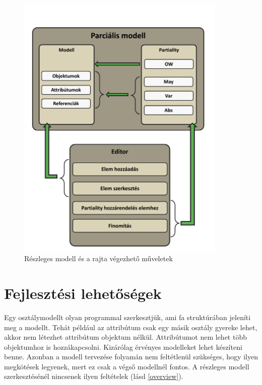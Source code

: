 \begin{figure}[!ht]
	\centering
	\includegraphics[width=100mm]{figures/overview.pdf}
	\caption{Részleges modell és a rajta végezhető műveletek} 
	\label{overview}
\end{figure}


\section{Fejlesztési lehetőségek}
Egy osztálymodellt olyan programmal szerkesztjük, ami fa struktúrában jeleníti meg a modellt. Tehát például az attribútum csak egy másik osztály gyereke lehet, akkor nem létezhet attribútum objektum nélkül. Attribútumot nem lehet több objektumhoz is hozzákapcsolni. Kizárólag érvényes modelleket lehet készíteni benne. Azonban a modell tervezése folyamán nem feltétlenül szükséges, hogy ilyen megkötések legyenek, mert ez csak a végső modellnél fontos. A részleges modell szerkesztésénél nincsenek ilyen feltételek (lásd \autoref{overview}). 

